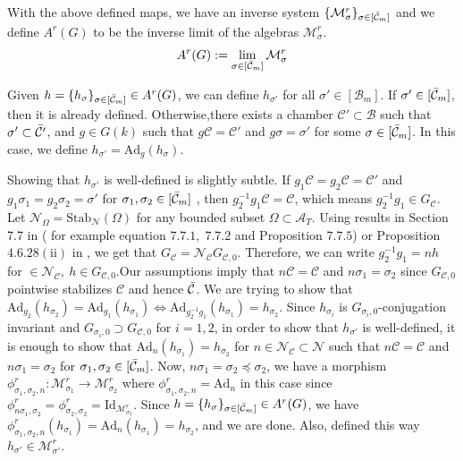 \documentclass[11 pt]{article}
\numberwithin{equation}{subsection}
\theoremstyle{definition}
\theoremstyle{remark}
\theoremstyle{conjecture}
\newcommand{\Ad}{\mathrm{Ad}}
\newcommand{\A}{\mathcal A}
\newcommand{\M}{\mathcal{M}}
\newcommand{\B}{\mathcal{B}}
\newcommand{\mc}{\mathcal}
\newcommand{\mcC}{\mathcal C}
\begin{document}
With the above defined maps, we have an inverse system $\{\M^r_{\sigma}\}_{\sigma\in [\Bar{\mcC}_m] }$ and we define $A^r(G)$ to be the inverse limit of the algebras $\M^r_{\sigma}$.
$$ A^r(G) := \lim_{\sigma\in [\Bar{\mcC}_m] } \M^r_{\sigma}$$

Given $h=\{ h_\sigma\}_{\sigma\in [\Bar{\mcC}_m]}\in A^r(G)$, we can define $h_{\sigma'}$ for all $\sigma' \in [\B_m]$. If $\sigma'\in [\Bar{\mcC}_m]$, then it is already defined. Otherwise,there exists a chamber $\mcC' \subset \B$ such that $\sigma' \subset \Bar{\mcC'}$, and $g\in G(k)$ such that $g\mcC=\mcC'$ and $ g\sigma =\sigma'$ for some $\sigma \in [\Bar{\mcC}_m]$. In this case, we define $h_{\sigma'} = \Ad_g(h_\sigma)$. \par
Showing that $h_{\sigma'}$ is well-defined is slightly subtle. If $g_1\mcC=g_2\mcC=\mcC'$ and $g_1 \sigma_1 =g_2\sigma_2 =\sigma'$ for $\sigma_1,\sigma_2 \in [\Bar{\mcC}_m]$ , then $g_2^{-1}g_1\mcC=\mcC$, which means $g_2^{-1}g_1 \in G_\mcC$. Let $\mc N_\Omega = \text{Stab}_{\mc N}(\Omega)$ for any bounded subset $\Omega\subset \A_T$. Using results in Section 7.7 in \cite{KP23}( for example equation $7.7.1,\;7.7.2$ and Proposition $7.7.5$) or Proposition $4.6.28 (\mathrm{ii})$ in \cite{BT84}, we get that $G_\mcC=\mc N_\mcC G_{\mcC,0}$. Therefore, we can write $g_2^{-1}g_1 = n h $ for $\in \mc N_\mcC,\: h\in G_{\mcC,0}$.Our assumptions imply that $n\mcC= \mcC$ and $n\sigma_1=\sigma_2$ since $G_{\mcC,0}$ pointwise stabilizes $\mcC$ and hence $\Bar{\mcC}$.  We are trying to show that $\Ad_{g_2}(h_{\sigma_2})= \Ad_{g_1}(h_{\sigma_1}) \Leftrightarrow \Ad_{g_2^{-1}g_1}(h_{\sigma_1}) = h_{\sigma_2}$. Since $h_{\sigma_i} $ is $G_{\sigma_i,0}$-conjugation invariant and $G_{\sigma_i,0}\supset G_{\mcC,0}$ for $i=1,2$, in order to show that $h_{\sigma'}$ is well-defined, it is enough to show that $\Ad_n(h_{\sigma_1})=h_{\sigma_2}$ for $n \in \mc N_\mcC\subset \mc N$ such that $n\mcC=\mcC$ and $n\sigma_1 =\sigma_2$ for $\sigma_1,\sigma_2  \in [\Bar{\mcC}_m] $. Now, $n\sigma_1 =\sigma_2 \preceq \sigma_2 $, we have a morphism $\phi^r_{\sigma_1,\sigma_2,n}:\M^r_{\sigma_1} \longrightarrow \M^r_{\sigma_2}$ where $\phi^r_{\sigma_1,\sigma_2,n} = \Ad_n$ in this case since $\phi^r_{n\sigma_1,\sigma_2}=\phi^r_{\sigma_2,\sigma_2}= \text{Id}_{\M^r_{\sigma_2}}$. Since $h=\{ h_\sigma\}_{\sigma\in [\Bar{\mcC}_m]}\in A^r(G)$, we have $\phi^r_{\sigma_1,\sigma_2,n}(h_{\sigma_1})=\Ad_n(h_{\sigma_1})= h_{\sigma_2}$, and we are done. Also, defined this way $h_{\sigma'} \in \M_{\sigma'}^r$. \par
\end{document}
